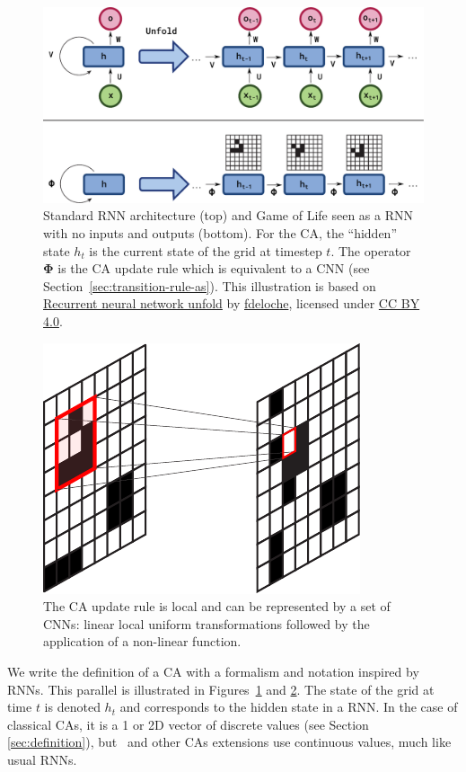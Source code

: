 \begin{figure}[htbp]
  \centering
  \includegraphics[width=\linewidth]{figures/rnn_and_gol.pdf}
  \caption{\label{fig:standard_rnn} Standard RNN architecture (top) and Game of
    Life seen as a RNN with no inputs and outputs (bottom). For the \ac{CA}, the
    ``hidden'' state $h_t$ is the current state of the grid at timestep $t$. The
    operator $\boldsymbol{\Phi}$ is the \ac{CA} update rule which is
    equivalent to a \ac{CNN} (see Section~\ref{sec:transition-rule-as}). This
    illustration is based on
    \href{https://commons.wikimedia.org/wiki/File:Recurrent_neural_network_unfold.svg}{Recurrent
      neural network unfold} by
    \href{https://commons.wikimedia.org/wiki/User:Ixnay}{fdeloche}, licensed
    under \href{https://creativecommons.org/licenses/by-sa/4.0/}{CC BY 4.0}.}
\end{figure}


\begin{figure}[htbp]
  \centering
  \includegraphics[width=.3\linewidth]{figures/ca_cnn}
  \caption{\label{fig:ca_cnn}The CA update rule is local and can be represented
    by a set of \acp{CNN}: linear local uniform transformations
    followed by the application of a non-linear function.}
\end{figure}

We write the definition of a \ac{CA} with a formalism and notation inspired by \acp{RNN}. This parallel is illustrated in Figures~\ref{fig:standard_rnn} and \ref{fig:ca_cnn}. The state of the grid at time $t$ is denoted $h_t$ and
corresponds to the hidden state in a RNN\@. In the case of classical \acp{CA},
it is a 1 or 2D vector of discrete values (see Section \ref{sec:definition}),
but~\parencite{mordvintsevGrowingNeuralCellular2020} and other \acp{CA}
extensions use continuous values, much like usual \acp{RNN}.

